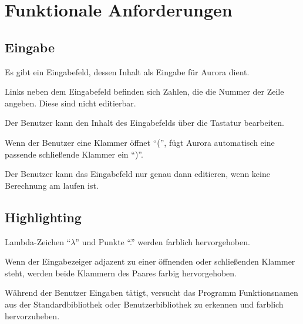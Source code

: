 \documentclass[parskip=full,11pt,twoside]{scrartcl}
\begin{document}
\section{Funktionale Anforderungen}

\subsection{Eingabe}

Es gibt ein Eingabefeld, dessen Inhalt als Eingabe für Aurora dient.

Links neben dem Eingabefeld befinden sich Zahlen, die die Nummer der Zeile angeben. Diese sind nicht editierbar.

Der Benutzer kann den Inhalt des Eingabefelds über die Tastatur bearbeiten.

Wenn der Benutzer eine Klammer öffnet \enquote{(}, fügt Aurora automatisch eine passende schließende Klammer ein \enquote{)}.

Der Benutzer kann das Eingabefeld nur genau dann editieren, wenn keine Berechnung am laufen ist.




\subsection{Highlighting}

Lambda-Zeichen \enquote{$\lambda$} und Punkte \enquote{.} werden farblich hervorgehoben.

Wenn der Eingabezeiger adjazent zu einer öffnenden oder schließenden Klammer steht, werden beide Klammern des Paares farbig hervorgehoben.

Während der Benutzer Eingaben tätigt, versucht das Programm Funktionsnamen aus der Standardbibliothek oder Benutzerbibliothek zu erkennen und farblich hervorzuheben.
\end{document}

